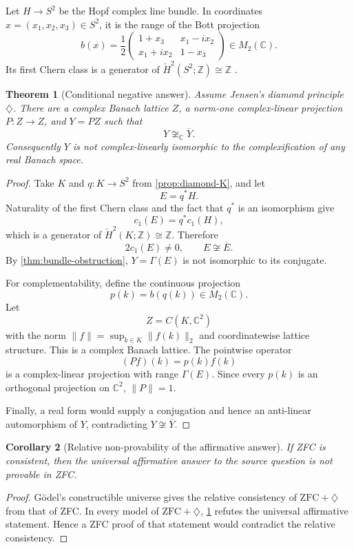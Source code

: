 \documentclass[11pt]{article}
\newtheorem{theorem}{Theorem}[section]
\newtheorem{corollary}[theorem]{Corollary}
\theoremstyle{definition}
\theoremstyle{remark}
\newcommand{\C}{\mathbb C}
\newcommand{\Z}{\mathbb Z}
\newcommand{\Hcheck}{\check H}
\begin{document}
Let $H\to S^2$ be the Hopf complex line bundle. In coordinates $x=(x_1,x_2,x_3)\in S^2$, it is the range of the Bott projection
\[
 b(x)=\frac12
 \begin{pmatrix}
 1+x_3 & x_1-ix_2\\
 x_1+ix_2 & 1-x_3
 \end{pmatrix}
 \in M_2(\C).
\]
Its first Chern class is a generator of $\Hcheck^2(S^2;\Z)\cong\Z$ \cite{Spanier}.

\begin{theorem}[Conditional negative answer]\label{thm:diamond-counterexample}
Assume Jensen's diamond principle $\diamondsuit$. There are a complex Banach lattice $Z$, a norm-one complex-linear projection $P:Z\to Z$, and $Y=PZ$ such that
\[
       Y\not\cong_{\C}\overline Y.
\]
Consequently $Y$ is not complex-linearly isomorphic to the complexification of any real Banach space.
\end{theorem}

\begin{proof}
Take $K$ and $q:K\to S^2$ from \cref{prop:diamond-K}, and let
\[
       E=q^*H.
\]
Naturality of the first Chern class and the fact that $q^*$ is an isomorphism give
\[
       c_1(E)=q^*c_1(H),
\]
which is a generator of $\Hcheck^2(K;\Z)\cong\Z$. Therefore
\[
       2c_1(E)\ne0,
       \qquad E\not\cong\overline E.
\]
By \cref{thm:bundle-obstruction}, $Y=\Gamma(E)$ is not isomorphic to its conjugate.

For complementability, define the continuous projection
\[
       p(k)=b(q(k))\in M_2(\C).
\]
Let
\[
       Z=C(K,\C^2)
\]
with the norm $\|f\|=\sup_{k\in K}\|f(k)\|_2$ and coordinatewise lattice structure. This is a complex Banach lattice. The pointwise operator
\[
       (Pf)(k)=p(k)f(k)
\]
is a complex-linear projection with range $\Gamma(E)$. Since every $p(k)$ is an orthogonal projection on $\C^2$, $\|P\|=1$.

Finally, a real form would supply a conjugation and hence an anti-linear automorphism of $Y$, contradicting $Y\not\cong\overline Y$.
\end{proof}

\begin{corollary}[Relative non-provability of the affirmative answer]\label{cor:relative-consistency}
If ZFC is consistent, then the universal affirmative answer to the source question is not provable in ZFC.
\end{corollary}

\begin{proof}
G\"odel's constructible universe gives the relative consistency of $\mathrm{ZFC}+\diamondsuit$ from that of ZFC. In every model of $\mathrm{ZFC}+\diamondsuit$, \cref{thm:diamond-counterexample} refutes the universal affirmative statement. Hence a ZFC proof of that statement would contradict the relative consistency.
\end{proof}
\end{document}

